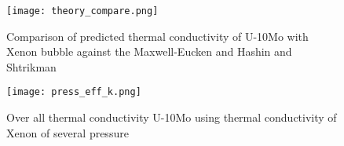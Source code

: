 \begin{doublespacing}
\begin{figure}[H]
	\centering
	\texttt{[image: theory\_compare.png]}
	\caption{Comparison of predicted thermal conductivity of U-10Mo with Xenon bubble against the Maxwell-Eucken and Hashin and Shtrikman }
	\label{fig_compare}
	\end{figure}


\begin{figure}[H]
	\centering
	\texttt{[image: press\_eff\_k.png]}
	\caption{Over all thermal conductivity U-10Mo using thermal conductivity of Xenon of several pressure}
	\label{fig_press_K}
	
\end{figure}




\end{doublespacing}
